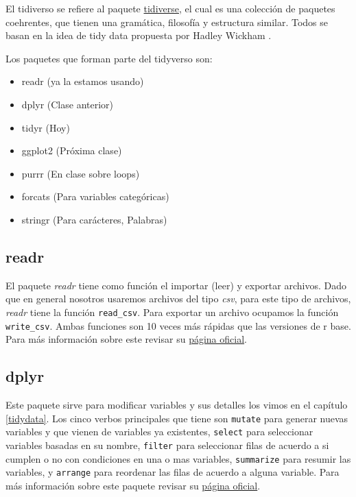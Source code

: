 \documentclass[]{book}
\providecommand{\tightlist}{%
  \setlength{\itemsep}{0pt}\setlength{\parskip}{0pt}}
\begin{document}
El tidiverso se refiere al paquete
\href{https://www.tidyverse.org/}{tidiverse}, el cual es una colección
de paquetes coehrentes, que tienen una gramática, filosofía y estructura
similar. Todos se basan en la idea de tidy data propuesta por Hadley
Wickham \citep{wickham2014tidy}.

Los paquetes que forman parte del tidyverso son:

\begin{itemize}
\tightlist
\item
  readr (ya la estamos usando)
\item
  dplyr (Clase anterior)
\item
  tidyr (Hoy)
\item
  ggplot2 (Próxima clase)
\item
  purrr (En clase sobre loops)
\item
  forcats (Para variables categóricas)
\item
  stringr (Para carácteres, Palabras)
\end{itemize}

\hypertarget{readr}{%
\subsection{readr}\label{readr}}

El paquete \emph{readr} \citep{Wickhamreadr} tiene como función el
importar (leer) y exportar archivos. Dado que en general nosotros
usaremos archivos del tipo \emph{csv}, para este tipo de archivos,
\emph{readr} tiene la función \texttt{read\_csv}. Para exportar un
archivo ocupamos la función \texttt{write\_csv}. Ambas funciones son 10
veces más rápidas que las versiones de r base. Para más información
sobre este revisar su \href{https://readr.tidyverse.org/}{página
oficial}.

\hypertarget{dplyr-1}{%
\subsection{dplyr}\label{dplyr-1}}

Este paquete sirve para modificar variables y sus detalles los vimos en
el capítulo \ref{tidydata}. Los cinco verbos principales que tiene son
\texttt{mutate} para generar nuevas variables y que vienen de variables
ya existentes, \texttt{select} para seleccionar variables basadas en su
nombre, \texttt{filter} para seleccionar filas de acuerdo a si cumplen o
no con condiciones en una o mas variables, \texttt{summarize} para
resumir las variables, y \texttt{arrange} para reordenar las filas de
acuerdo a alguna variable. Para más información sobre este paquete
revisar su \href{https://dplyr.tidyverse.org/}{página oficial}.
\end{document}
